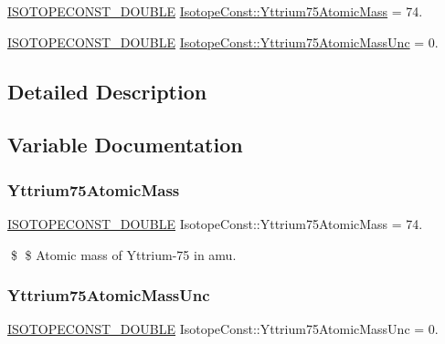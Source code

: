 \begin{DoxyCompactItemize}
\item 
\mbox{\hyperlink{group___isotope_const-_macros_ga8f45a7272ce02c0b4c65c44636ed719a}{I\+S\+O\+T\+O\+P\+E\+C\+O\+N\+S\+T\+\_\+\+D\+O\+U\+B\+LE}} \mbox{\hyperlink{group___isotope_const-_yttrium-_y75_ga134e351fb7b6932953e52fea502adc66}{Isotope\+Const\+::\+Yttrium75\+Atomic\+Mass}} = 74.
\item 
\mbox{\hyperlink{group___isotope_const-_macros_ga8f45a7272ce02c0b4c65c44636ed719a}{I\+S\+O\+T\+O\+P\+E\+C\+O\+N\+S\+T\+\_\+\+D\+O\+U\+B\+LE}} \mbox{\hyperlink{group___isotope_const-_yttrium-_y75_ga41a399e42b3ae6fe814812c1aba488c3}{Isotope\+Const\+::\+Yttrium75\+Atomic\+Mass\+Unc}} = 0.
\end{DoxyCompactItemize}


\subsection{Detailed Description}


\subsection{Variable Documentation}
\mbox{\label{group___isotope_const-_yttrium-_y75_ga134e351fb7b6932953e52fea502adc66}} 
\subsubsection{\texorpdfstring{Yttrium75\+Atomic\+Mass}{Yttrium75AtomicMass}}
{\footnotesize\ttfamily \mbox{\hyperlink{group___isotope_const-_macros_ga8f45a7272ce02c0b4c65c44636ed719a}{I\+S\+O\+T\+O\+P\+E\+C\+O\+N\+S\+T\+\_\+\+D\+O\+U\+B\+LE}} Isotope\+Const\+::\+Yttrium75\+Atomic\+Mass = 74.}

\$ \$ Atomic mass of Yttrium-\/75 in amu. \mbox{\label{group___isotope_const-_yttrium-_y75_ga41a399e42b3ae6fe814812c1aba488c3}} 
\subsubsection{\texorpdfstring{Yttrium75\+Atomic\+Mass\+Unc}{Yttrium75AtomicMassUnc}}
{\footnotesize\ttfamily \mbox{\hyperlink{group___isotope_const-_macros_ga8f45a7272ce02c0b4c65c44636ed719a}{I\+S\+O\+T\+O\+P\+E\+C\+O\+N\+S\+T\+\_\+\+D\+O\+U\+B\+LE}} Isotope\+Const\+::\+Yttrium75\+Atomic\+Mass\+Unc = 0.}

